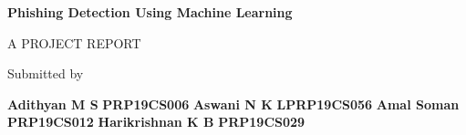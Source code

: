 

\begin{titlepage}
	\begin{center}
		\vspace{0.35cm}
		\vspace{0.5cm}
		\textbf{\Large{Phishing Detection Using Machine Learning }}\\ \vspace{0.9cm}
	
		\normalsize
		
     	\vspace{2cm}
     	A PROJECT REPORT 
		
		Submitted by\\
		\vspace{0.8cm}
		\begin{FlushLeft}
		\hspace{3.7cm}
		\textbf{{\selectfont Adithyan M S}}\hspace{1.1cm}
		\textbf{{\selectfont PRP19CS006}}\newline \vspace{0.1cm}
		\hspace{3.7cm}
		\textbf{{\selectfont Aswani N K}}\hspace{1.6cm}
		\textbf{{\selectfont LPRP19CS056}}\newline
		\vspace{0.1cm}
		\hspace{3.7cm}
		\textbf{{\selectfont Amal Soman}}\hspace{1.35cm}
		\textbf{{\selectfont PRP19CS012}}\newline
		\vspace{0.1cm}
		\hspace{3.7cm}
		\textbf{{\selectfont Harikrishnan K B}}\hspace{0.3cm}
		\textbf{{\selectfont PRP19CS029}}
		\end{FlushLeft}
		\vspace{0.7cm}
	        

\end{center}
\end{titlepage}
